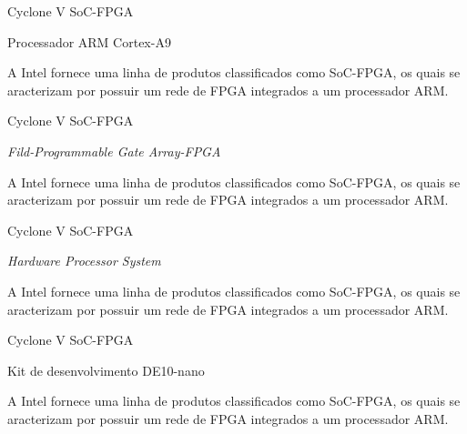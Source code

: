 \documentclass[10pt]{beamer}
\begin{document}
\begin{frame}{Cyclone V SoC-FPGA}
	\begin{alertblock}{Processador ARM Cortex-A9}
		\vspace{0.1cm}
		\begin{justify}
			A Intel fornece uma linha de produtos classificados como SoC-FPGA, os quais se aracterizam por possuir um rede de FPGA integrados a um processador ARM.
		\end{justify}
		

	\end{alertblock}
\end{frame}

\begin{frame}{Cyclone V SoC-FPGA}
	\begin{alertblock}{\textit{Fild-Programmable Gate Array-FPGA}}
		\vspace{0.1cm}
		\begin{justify}
			A Intel fornece uma linha de produtos classificados como SoC-FPGA, os quais se aracterizam por possuir um rede de FPGA integrados a um processador ARM.
		\end{justify}
		

	\end{alertblock}
\end{frame}

\begin{frame}{Cyclone V SoC-FPGA}
	\begin{alertblock}{\textit{Hardware Processor System}}
		\vspace{0.1cm}
		\begin{justify}
			A Intel fornece uma linha de produtos classificados como SoC-FPGA, os quais se aracterizam por possuir um rede de FPGA integrados a um processador ARM.
		\end{justify}
		

	\end{alertblock}
\end{frame}

\begin{frame}{Cyclone V SoC-FPGA}
	\begin{alertblock}{Kit de desenvolvimento DE10-nano}
		\vspace{0.1cm}
		\begin{justify}
			A Intel fornece uma linha de produtos classificados como SoC-FPGA, os quais se aracterizam por possuir um rede de FPGA integrados a um processador ARM.
		\end{justify}
		

	\end{alertblock}
\end{frame}
\end{document}
